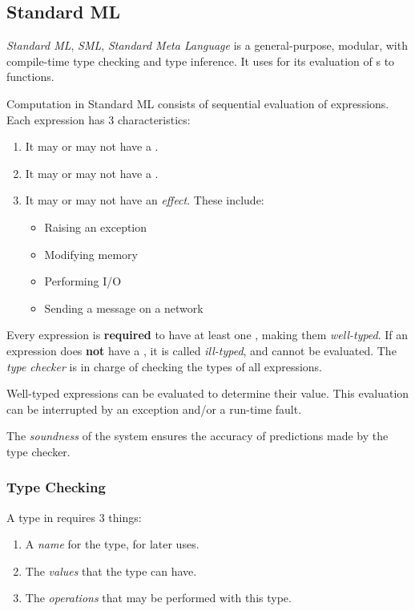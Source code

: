 \subsection{Standard ML}\label{subsec:Functional-Standard_ML}
\begin{definition}[Standard ML]\label{def:Standard_ML}
  \emph{Standard ML}, \emph{SML}, \emph{Standard Meta Language} is a general-purpose, modular,  with compile-time type checking and type inference.
  It uses  for its evaluation of s to functions.
\end{definition}

Computation in Standard ML consists of sequential evaluation of expressions.
Each expression has 3 characteristics:
\begin{enumerate}[noitemsep]
\item It may or may not have a \emph{}.
\item It may or may not have a \emph{}.
\item It may or may not have an \emph{effect}. These include:
  \begin{itemize}[noitemsep]
  \item Raising an exception
  \item Modifying memory
  \item Performing I/O
  \item Sending a message on a network
  \end{itemize}
\end{enumerate}

Every expression is \textbf{required} to have at least one , making them \emph{well-typed}.
If an expression does \textbf{not} have a , it is called \emph{ill-typed}, and cannot be evaluated.
The \emph{type checker} is in charge of checking the types of all expressions.

Well-typed expressions can be evaluated to determine their value.
This evaluation can be interrupted by an exception and/or a run-time fault.

\begin{definition}[Soundness]\label{def:Functional_Lang-Soundness}
  The \emph{soundness} of the  system ensures the accuracy of predictions made by the type checker.
\end{definition}

\subsubsection{Type Checking}\label{subsubsec:Functional-SML-Type_Checking}
A type in  requires 3 things:
\begin{enumerate}[noitemsep]
\item A \emph{name} for the type, for later uses.
\item The \emph{values} that the type can have.
\item The \emph{operations} that may be performed with this type.
\end{enumerate}


